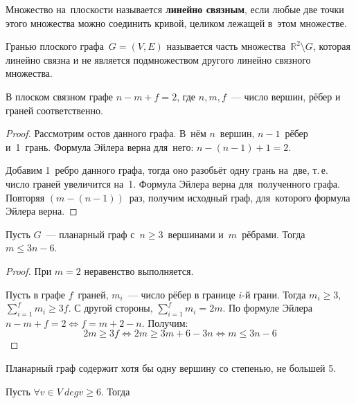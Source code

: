 \begin{definition}
Множество на~плоскости называется \textbf{линейно связным}, если любые две точки этого множества можно соединить кривой, целиком лежащей в~этом множестве.
\end{definition}

\begin{definition}
Гранью плоского графа~$G = (V, E)$ называется часть множества~$\mathbb R^2 \setminus G$, которая линейно связна и не является подмножеством другого линейно связного множества.
\end{definition}

\begin{theorem}
В плоском связном графе $n - m + f = 2$, где $n, m, f$~--- число вершин, рёбер и граней соответственно.
\end{theorem}
\begin{proof}
Рассмотрим остов данного графа.
В~нём $n$~вершин, $n - 1$~рёбер и~1~грань.
Формула Эйлера верна для~него: $n - (n - 1) + 1 = 2$.

Добавим 1~ребро данного графа, тогда оно разобьёт одну грань на~две, т.\,е. число граней увеличится на~1.
Формула Эйлера верна для~полученного графа.
Повторяя $(m - (n - 1))$~раз, получим исходный граф, для~которого формула Эйлера верна.
\end{proof}

\begin{theorem}
Пусть $G$~--- планарный граф с~$n \geqslant 3$~вершинами и~$m$~рёбрами. Тогда $m \leqslant 3n - 6$.
\end{theorem}
\begin{proof}
При $m = 2$ неравенство выполняется.

Пусть в графе $f$~граней, $m_i$~--- число рёбер в границе $i$\nobreakdash-й грани.
Тогда $m_i \geqslant 3$, $\displaystyle \sum_{i=1}^f m_i \geqslant 3f$.
С другой стороны, $\displaystyle \sum_{i=1}^f m_i = 2m$.
По формуле Эйлера $n - m + f = 2 \Leftrightarrow f = m + 2 - n$.
Получим:
\begin{equation*}
2m \geqslant 3f \Leftrightarrow 2m \geqslant 3m + 6 - 3n \Leftrightarrow m \leqslant 3n - 6
\end{equation*}
\end{proof}

\begin{consequent}
Планарный граф содержит хотя бы одну вершину со степенью, не большей 5.
\end{consequent}
\begin{proofcontra}
Пусть $\forall v \in V \ deg v \geqslant 6$.
Тогда 
\end{proofcontra}

